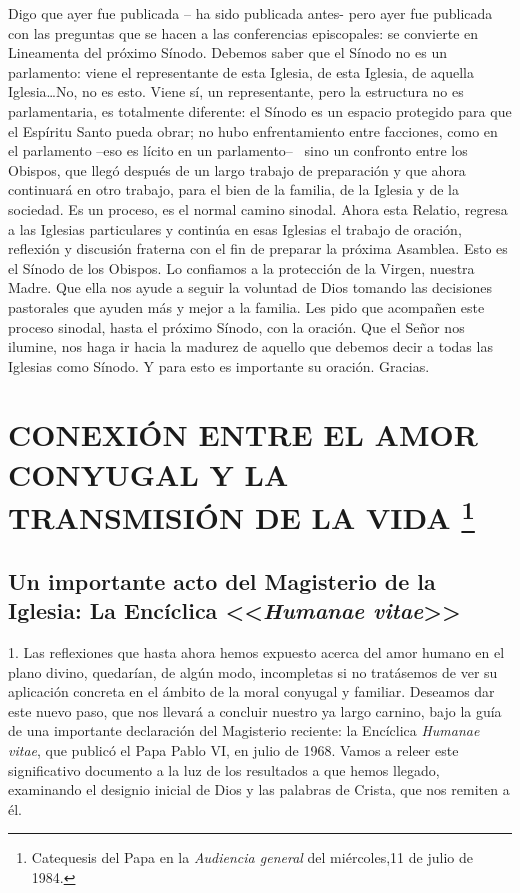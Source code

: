 \documentclass[letterpaper]{report}
\begin{document}
Digo que ayer fue publicada – ha sido publicada antes- pero ayer fue publicada con las preguntas que se hacen a las conferencias episcopales: se convierte en Lineamenta del próximo Sínodo.
Debemos saber que el Sínodo no es un parlamento: viene el representante de esta Iglesia, de esta Iglesia, de aquella Iglesia…No, no es esto. Viene sí, un representante, pero la estructura no es parlamentaria, es totalmente diferente: el Sínodo es un espacio protegido para que el Espíritu Santo pueda obrar; no hubo enfrentamiento entre facciones, como en el parlamento –eso es lícito en un parlamento–  sino un confronto entre los Obispos, que llegó después de un largo trabajo de preparación y que ahora continuará en otro trabajo, para el bien de la familia, de la Iglesia y de la sociedad. Es un proceso, es el normal camino sinodal.
Ahora esta Relatio, regresa a las Iglesias particulares y continúa en esas Iglesias el trabajo de oración, reflexión y discusión fraterna con el fin de preparar la próxima Asamblea. Esto es el Sínodo de los Obispos. Lo confiamos a la protección de la Virgen, nuestra Madre.
Que ella nos ayude a seguir la voluntad de Dios tomando las decisiones pastorales que ayuden más y mejor a la familia. Les pido que acompañen este proceso sinodal, hasta el próximo Sínodo, con la oración. Que el Señor nos ilumine, nos haga ir hacia la madurez de aquello que debemos decir a todas las Iglesias como Sínodo. Y para esto es importante su oración. Gracias.
	
	{\centering 
		\section
		[CONEXI\'ON ENTRE EL AMOR CONYUGAL Y LA TRANSMISI\'ON DE LA VIDA]
		{
			{\normalsize CONEXI\'ON ENTRE EL AMOR CONYUGAL Y LA TRANSMISI\'ON DE LA VIDA
			\footnote{
				Catequesis del Papa en la \textit{Audiencia general} 
				del mi\'ercoles,11 de julio de 1984.
			}}
		}
	}
	 
		\subsection{{\normalsize Un importante acto del Magisterio de la Iglesia: 
		 La Enc\'iclica <<\textit{Humanae vitae}>>}}
			1. Las reflexiones que hasta ahora hemos expuesto 
			acerca del amor humano en el plano divino, quedar\'ian, 
			de alg\'un modo, incompletas si no trat\'asemos de ver su 
			aplicaci\'on concreta en el \'ambito de la moral conyugal y 
			familiar. Deseamos dar este nuevo paso, que nos llevar\'a 
			a concluir nuestro ya largo carnino, bajo la gu\'ia de una 
			importante declaraci\'on del Magisterio reciente: la Enc\'iclica 
			\textit{\textit{Humanae vitae}}, que public\'o el Papa Pablo VI, en julio 
			de 1968. Vamos a releer este significativo documento a la 
			luz de los resultados a que hemos llegado, examinando el 
			designio inicial de Dios y las palabras de Crista, que nos 
			remiten a \'el.
			
\end{document}
